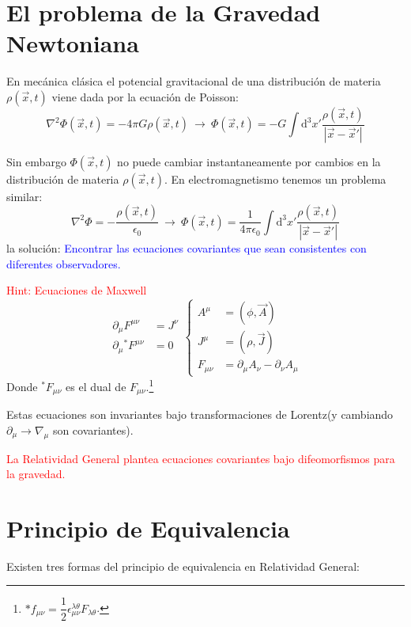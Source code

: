 \documentclass[../main]{subfiles}
\begin{document}
\section{El problema de la Gravedad Newtoniana}
En mecánica clásica el potencial gravitacional de una distribución de materia $\rho(\vec{x}, t)$ viene dada por la ecuación de Poisson:
\begin{equation}
    \nabla^2 \Phi(\vec{x}, t)=-4\pi G\rho(\vec{x}, t) \ \rightarrow \ \Phi(\vec{x}, t)=-G \int \mathrm{d}^3 x' \dfrac{\rho(\vec{x}, t)}{|\vec{x}-\vec{x}'|}
\end{equation}

Sin embargo $\Phi(\vec{x}, t)$ no puede cambiar instantaneamente por cambios en la distribución de materia $\rho(\vec{x}, t)$. En electromagnetismo tenemos un problema similar:
\begin{equation}
    \nabla^2 \Phi=-\dfrac{\rho(\vec{x}, t)}{\epsilon_0} \ \rightarrow \ \Phi(\vec{x}, t)=\dfrac{1}{4\pi \epsilon_0}\int \mathrm{d}^3 x' \dfrac{\rho(\vec{x}, t)}{|\vec{x}-\vec{x}'|}
\end{equation}
la solución: \textcolor{blue}{Encontrar las ecuaciones covariantes que sean consistentes con diferentes observadores.}

\textcolor{red}{Hint: Ecuaciones de Maxwell}
\begin{equation}
    \begin{split}
        \partial_{\mu} F^{\mu\nu}&=J^{\nu} \\
        \partial_{\mu}{}^{*} F^{\mu\nu}&=0
    \end{split}
    \left\{
    \begin{split}
        A^{\mu}&=(\phi, \vec{A})\\
        J^{\mu}&=(\rho, \vec{J})\\
        F_{\mu\nu}&=\partial_{\mu} A_{\nu}-\partial_{\nu}A_{\mu}
    \end{split}
    \right.
\end{equation}
Donde ${}^* F_{\mu\nu}$ es el dual de $F_{\mu\nu}$.\footnote{$*f_{\mu\nu}=\dfrac{1}{2}\epsilon_{\mu\nu}^{\lambda \theta}F_{\lambda\theta}$.} 

Estas ecuaciones son invariantes bajo transformaciones de Lorentz(y cambiando $\partial_{\mu}\rightarrow \nabla_{\mu}$ son covariantes).

\textcolor{red}{La Relatividad General plantea ecuaciones covariantes bajo difeomorfismos para la gravedad.}

\section{Principio de Equivalencia}
Existen tres formas del principio de equivalencia en Relatividad General:
\end{document}
